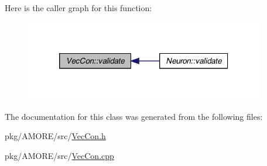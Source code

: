 Here is the caller graph for this function:
\nopagebreak
\begin{figure}[H]
\begin{center}
\leavevmode
\includegraphics[width=296pt]{class_vec_con_af008396d3982fb7ccf1af9618b89937c_icgraph}
\end{center}
\end{figure}




The documentation for this class was generated from the following files:\begin{DoxyCompactItemize}
\item 
pkg/AMORE/src/\hyperlink{_vec_con_8h}{VecCon.h}\item 
pkg/AMORE/src/\hyperlink{_vec_con_8cpp}{VecCon.cpp}\end{DoxyCompactItemize}

